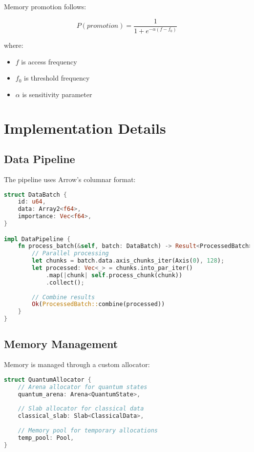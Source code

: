 \documentclass[10pt]{article}
\begin{document}
Memory promotion follows:

\begin{equation}
    P(promotion) = \frac{1}{1 + e^{-\alpha(f - f_0)}}
\end{equation}

where:
\begin{itemize}
    \item $f$ is access frequency
    \item $f_0$ is threshold frequency
    \item $\alpha$ is sensitivity parameter
\end{itemize}

\section{Implementation Details}

\subsection{Data Pipeline}

The pipeline uses Arrow's columnar format:

\begin{lstlisting}[language=rust]
struct DataBatch {
    id: u64,
    data: Array2<f64>,
    importance: Vec<f64>,
}

impl DataPipeline {
    fn process_batch(&self, batch: DataBatch) -> Result<ProcessedBatch> {
        // Parallel processing
        let chunks = batch.data.axis_chunks_iter(Axis(0), 128);
        let processed: Vec<_> = chunks.into_par_iter()
            .map(|chunk| self.process_chunk(chunk))
            .collect();
        
        // Combine results
        Ok(ProcessedBatch::combine(processed))
    }
}
\end{lstlisting}

\subsection{Memory Management}

Memory is managed through a custom allocator:

\begin{lstlisting}[language=rust]
struct QuantumAllocator {
    // Arena allocator for quantum states
    quantum_arena: Arena<QuantumState>,
    
    // Slab allocator for classical data
    classical_slab: Slab<ClassicalData>,
    
    // Memory pool for temporary allocations
    temp_pool: Pool,
}
\end{lstlisting}
\end{document}

